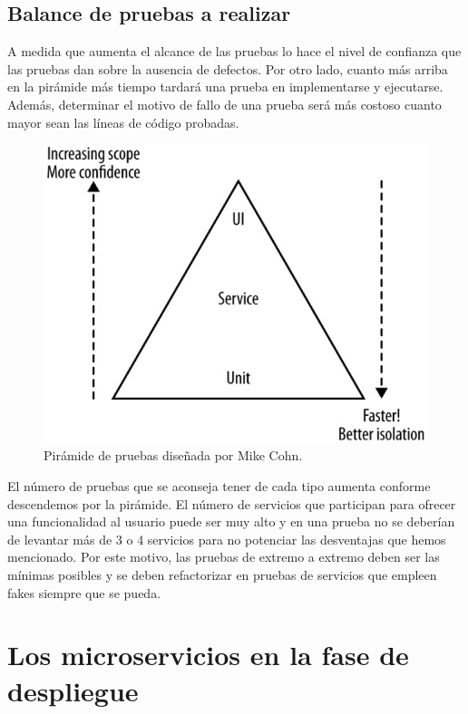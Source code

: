 \documentclass[11pt,spanish,listoffigures]{tfgetsinf}
\begin{document}
\subsection{Balance de pruebas a realizar}

A medida que aumenta el alcance de las pruebas lo hace el nivel de confianza que las pruebas dan sobre la ausencia de defectos. Por otro lado, cuanto más arriba en la pirámide más tiempo tardará una prueba en implementarse y ejecutarse. Además, determinar el motivo de fallo de una prueba será más costoso cuanto mayor sean las líneas de código probadas. \cite{Cohn2010}

\begin{figure}[h]
\centering
\includegraphics[scale=0.5]{Cohn_Pyramid}
\caption{Pirámide de pruebas diseñada por Mike Cohn. \cite{Cohn2010}}
\end{figure}

El número de pruebas que se aconseja tener de cada tipo aumenta conforme descendemos por la pirámide. El número de servicios que participan para ofrecer una funcionalidad al usuario puede ser muy alto y en una prueba no se deberían de levantar más de 3 o 4 servicios para no potenciar las desventajas que hemos mencionado. Por este motivo, las pruebas de extremo a extremo deben ser las mínimas posibles y se deben refactorizar en pruebas de servicios que empleen fakes siempre que se pueda.

\section{Los microservicios en la fase de despliegue}
\end{document}
